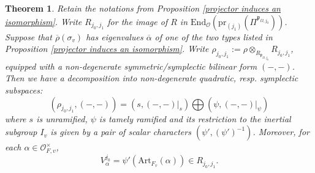 \documentclass[12pt,oneside,reqno]{amsart}
\theoremstyle{plain}
\newtheorem{theorem}{Theorem}[section]
\begin{document}
	
	\begin{theorem}\label{decomposition of the Galois representation}
		Retain the notations from
		Proposition
		\ref{projector induces an isomorphism}.
		Write
		$R_{j_0,j_1}$ for the image of
		$R$ in
		$\mathrm{End}_{\mathcal{O}}(\mathrm{pr}_{(j_1)}
		(\Pi^{\mathfrak{p}_{\Omega,j_0}}))$.
		Suppose that
		$\overline{\rho}(\sigma_v)$
		has eigenvalues $\overline{\alpha}$ of one
		of the two types listed in 
		Proposition
		\ref{projector induces an isomorphism}. Write
		$\rho_{j_0,j_1}
		:=
		\rho\otimes_{R_{\mathfrak{p}_{\Omega,j_0}}}
		R_{j_0,j_1}$, equipped with a non-degenerate symmetric/symplectic bilinear form $(-,-)$.
		Then we have a decomposition
		into non-degenerate quadratic, resp. symplectic subspaces:
		\[
		(\rho_{j_0,j_1},(-,-))
		=
		(s,(-,-)|_s)\bigoplus(\psi,(-,-)|_{\psi})
		\]
		where
		$s$ is unramified,
		$\psi$ is tamely ramified and its
		restriction to the inertial subgroup $I_v$ is given by a pair of scalar characters
		$(\psi',(\psi')^{-1})$.
		Moreover,
		for each
		$\alpha\in
		\mathcal{O}_{F,v}^\times$,
		\[
		V^{j_0}_\alpha
		=
		\psi'(\mathrm{Art}_{F_v}(\alpha))
		\in
		R_{j_0,j_1}.
		\]
	\end{theorem}
\end{document}
